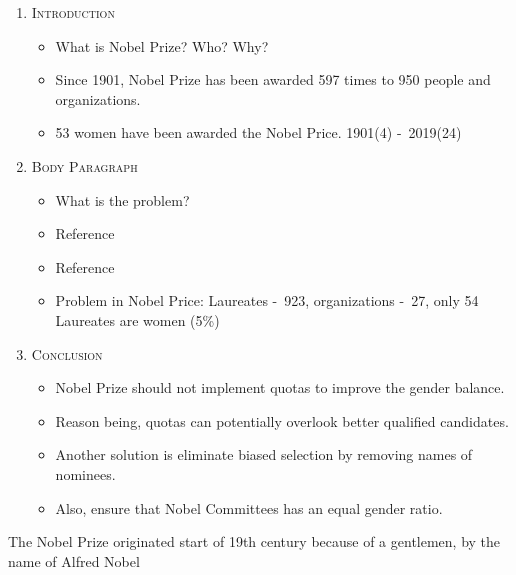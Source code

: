 \begin{enumerate}
  \item \textsc{Introduction}
  \begin{itemize}
    \item What is Nobel Prize? Who? Why?
    \item Since 1901, Nobel Prize has been awarded 597 times to 950 people and organizations. 
    \item 53 women have been awarded the Nobel Price. 1901(4) -\ 2019(24)
  \end{itemize}
  \item \textsc{Body Paragraph}
  \begin{itemize}
    \item What is the problem? 
    \item Reference \cite{doublebind} 
    \item Reference \cite{kopievanpbs}
    \item Problem in Nobel Price: Laureates -\ 923, organizations -\ 27, only 54 Laureates are women (5\%)\cite{alfrednoble}
  \end{itemize}
  \item \textsc{Conclusion}
  \begin{itemize}
    \item Nobel Prize should not implement quotas to improve the gender balance.
    \item Reason being, quotas can potentially overlook better qualified candidates.
    \item Another solution is eliminate biased selection by removing names of nominees.
    \item Also, ensure that Nobel Committees has an equal gender ratio.
  \end{itemize}
\end{enumerate}
\clearpage
{}
\par
The Nobel Prize originated start of 19th century because of a gentlemen, by the name of Alfred Nobel
